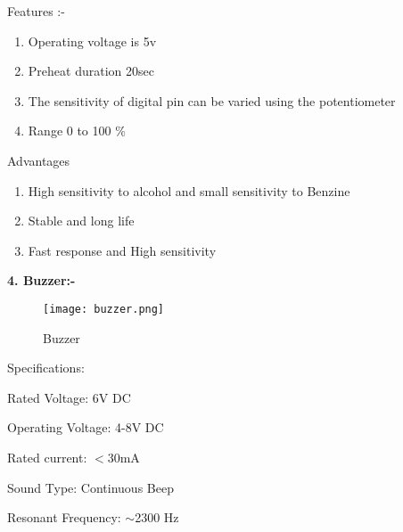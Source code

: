 \documentclass[12pt,a4paper]{report}
\begin{document}
\noindent Features :-

\begin{enumerate}
\item  Operating voltage is 5v

\item  Preheat duration 20sec

\item  The sensitivity of digital pin can be varied using the potentiometer 

\item  Range 0 to 100 \%
\end{enumerate}

\noindent 

\noindent Advantages

\begin{enumerate}
\item  High sensitivity to alcohol and small sensitivity to Benzine

\item  Stable and long life

\item  Fast response and High sensitivity
\end{enumerate}

\noindent 

\noindent 
\newpage
\noindent \textbf{4. Buzzer:-}

\begin{figure}[htp]
    \texttt{[image: buzzer.png]}
    \caption{Buzzer }
\end{figure}
\noindent \textbf{}

\noindent \textbf{}

\noindent \textbf{}

\noindent \textbf{}

\noindent \textbf{}

\noindent \textbf{}

\noindent \textbf{}

\noindent \textbf{}

\noindent       

\noindent 

\noindent Specifications:

\noindent Rated Voltage: 6V DC

\noindent Operating Voltage: 4-8V DC

\noindent Rated current: $\mathrm{<}$30mA

\noindent Sound Type: Continuous Beep

\noindent Resonant Frequency: $\mathrm{\sim}$2300 Hz~
\end{document}
